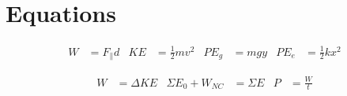 \documentclass[10pt]{exam}
\begin{document}
\section*{Equations}


\vspace{-1.5em}

\begin{align*}
  W    &= F_\parallel d &
  KE   &= \frac{1}{2} mv^2 &
  PE_g &= mgy &
  PE_e &= \frac{1}{2} kx^2
\end{align*}

\vspace{-1.5em}

\begin{align*}
  W &= \Delta KE &
  \Sigma E_0 + W_{NC} &= \Sigma E &
  P &= \frac{W}{t}
\end{align*}
\end{document}
